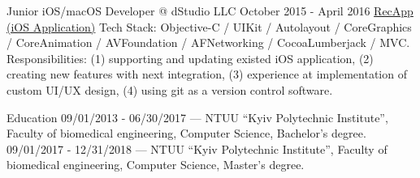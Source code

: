 \documentclass{article}
\begin{document}
Junior iOS/macOS Developer @ dStudio LLC
October 2015 - April 2016
\href{https://apps.apple.com/ua/app/recapp-the-most-advanced-free-voice-recorder/id743908852}{RecApp (iOS Application)}
Tech Stack: Objective-C / UIKit / Autolayout / CoreGraphics / CoreAnimation / AVFoundation / AFNetworking / CocoaLumberjack / MVC.
Responsibilities: (1) supporting and updating existed iOS application, (2) creating new features with next integration, (3) experience at implementation of custom UI/UX design, (4) using git as a version control software.

Education
09/01/2013 - 06/30/2017 — NTUU “Kyiv Polytechnic Institute”, Faculty of biomedical engineering,
Computer Science, Bachelor's degree.
09/01/2017 - 12/31/2018 — NTUU “Kyiv Polytechnic Institute”, Faculty of biomedical engineering,
Computer Science, Master’s degree.
\end{document}
